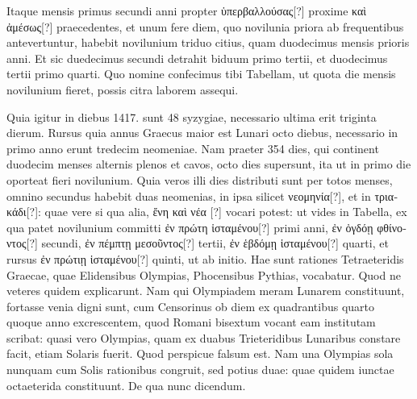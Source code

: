 Itaque mensis primus
secundi anni propter \textgreek{ὑπερβαλλούσας[?]} proxime
 \textgreek{καὶ ἀμέσως[?]} praecedentes, et unum
fere diem, quo novilunia priora ab frequentibus antevertuntur, habebit
novilunium triduo citius, quam duodecimus mensis prioris anni.
Et sic duedecimus secundi detrahit biduum primo tertii, et duodecimus
tertii primo quarti.
Quo nomine confecimus tibi Tabellam, ut
quota die mensis novilunium fieret, possis citra laborem assequi.
\begin{table}[htbp]
  
\end{table}
%
Quia
igitur in diebus 1417. sunt 48 syzygiae, necessario
ultima erit triginta dierum.
Rursus quia annus
Graecus maior est Lunari octo diebus, necessario
in primo anno erunt tredecim neomeniae.
Nam
praeter 354 dies, qui continent duodecim menses
alternis plenos et cavos, octo dies supersunt, ita ut
in primo die oporteat fieri novilunium.
Quia veros
illi dies distributi sunt per totos menses, omnino
secundus habebit duas neomenias, in ipsa silicet
\textgreek{νεομηνία[?]}, et in \textgreek{τριακάδι[?]}: quae vere si qua alia,
\textgreek{ἔνη καὶ νέα [?]} vocari potest: ut vides in Tabella, ex qua
patet novilunium committi \textgreek{ἐν πρώτη ἱσταμένου[?]} primi
anni, \textgreek{ἐν ὀγδόῃ φθίνοντος[?]} secundi,
 \textgreek{ἐν πέμπτῃ μεσοῦντος[?]}
tertii, \textgreek{ἐν ἑβδόμῃ ἱσταμένου[?]} quarti, et rursus \textgreek{ἐν πρώτιῃ
ἱσταμένου[?]}
quinti, ut ab initio.
Hae sunt rationes Tetraeteridis Graecae,
quae Elidensibus Olympias, Phocensibus Pythias, vocabatur.
%
Quod ne veteres quidem explicarunt.
Nam qui Olympiadem meram
Lunarem constituunt, fortasse venia digni sunt, cum Censorinus ob
diem ex quadrantibus quarto quoque anno excrescentem, quod Romani
bisextum vocant eam institutam scribat:
quasi vero Olympias,
quam ex duabus Trieteridibus Lunaribus constare facit, etiam Solaris
fuerit.
Quod perspicue falsum est.
Nam una Olympias sola nunquam
cum Solis rationibus congruit, sed potius duae: quae quidem iunctae
octaeterida constituunt.
De qua nunc dicendum.
